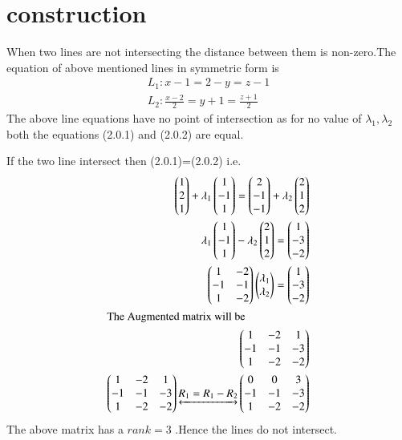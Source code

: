 \documentclass[journal,12pt,twocolumn]{IEEEtran}
\newcommand{\myvec}[1]{\ensuremath{\begin{pmatrix}#1\end{pmatrix}}}
\numberwithin{equation}{subsection}
\begin{document}
\section{construction}
When two lines are not intersecting the distance between them is non-zero.The equation of above mentioned lines in symmetric form is
\begin{align}
    L_1\colon x-1=2-y=z-1\\
    L_2\colon \frac{x-2}{2}=y+1=\frac{z+1}{2}
\end{align}
The above line equations have no point of intersection as for no value of $\lambda_1,\lambda_2$ both the equations (2.0.1) and (2.0.2) are equal.\par
If the two line intersect then (2.0.1)=(2.0.2) i.e.
\begin{align}
    \myvec{1\\2\\1}+\lambda_1\myvec{1\\-1\\1}=\myvec{2\\-1\\-1}+\lambda_2\myvec{2\\1\\2}\\
    \lambda_1\myvec{1\\-1\\1}-\lambda_2\myvec{2\\1\\2}=\myvec{1\\-3\\-2}\\
    \myvec{1 & -2\\-1 & -1\\1 & -2}\myvec{\lambda_1\\\lambda_2}=\myvec{1\\-3\\-2}\\
    \intertext{The Augmented matrix will be}
    \myvec{1 & -2 & 1\\-1 & -1 & -3\\1 & -2 & -2}\\
    \myvec{1 & -2 & 1\\-1 & -1 & -3\\1 & -2 & -2}\underleftrightarrow{R_1=R_1-R_2}\myvec{0 & 0 & 3\\-1 & -1 & -3\\1 & -2 & -2}
\end{align}
The above matrix has a $rank=3$ .Hence the lines do not intersect.
\end{document}
